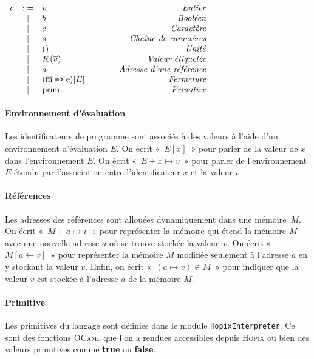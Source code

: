 \documentclass[a4paper,8pt]{article}
\newcommand{\comment}[1]{\hspace{3cm}\hfill \mbox{\textit{#1}}}
\newenvironment{BNF}[1][\linewidth]%
{\begin{math}\begin{array}{rclr}}%
{\end{array}\end{math}}%
\newcommand{\car}[1]{\texttt{#1}}
\newcommand\mvalue{v}
\newcommand\env{E}
\newcommand\store{M}
\newcommand\meta[1]{\textrm{#1}}
\newcommand\expr{\meta{e}}
\newcommand\id{x}
\newcommand\cid{K}
\newcommand\lint{n}
\newcommand\lchar{c}
\newcommand\lbool{b}
\newcommand\lstring{s}
\newcommand\pattern{\meta{m}}
\newcommand\addr{a}
\newcommand\unit{()}
\newlength\codewidth
\newenvironment{code}[1][\codewidth]{
\begin{center}
\Sbox
\hspace{0.3cm}\minipage{#1}\small
}{
\endminipage
\endSbox\fbox{\TheSbox}
\end{center}
}
\newcommand\many[1]{\overline{#1}}
\begin{document}
\begin{code}[17cm]
\begin{BNF}
  \mvalue & ::= &
\lint
\comment{Entier}
\\
& | &
\lbool
\comment{Booléen}
\\
& | &
\lchar
\comment{Caractère}
\\
& | &
\lstring
\comment{Chaîne de caractères}
\\
& | &
\unit
\comment{Unité}
\\
& | &
\cid (\many\mvalue)
\comment{Valeur étiquetée}
\\
& | &
\addr
\comment{Adresse d'une référence}
\\
& | &
(\many\pattern \;\car{=>}\; \expr) [\env]
\comment{Fermeture}
\\
& | &
\textrm{prim}
\comment{Primitive}
\end{BNF}
\end{code}

\paragraph{Environnement d'évaluation}
Les identificateurs de programme sont associés à des valeurs à l'aide
d'un environnement d'évaluation $\env$. On écrit «~$\env[\id]$~» pour
parler de la valeur de $\id$ dans l'environnement $\env$.  On écrit
«~$\env + \id \mapsto \mvalue$~» pour parler de l'environnement $\env$
étendu par l'association entre l'identificateur $\id$ et la valeur
$\mvalue$.

\paragraph{Références}
Les adresses des références sont allouées dynamiquement dans une
mémoire~$\store$.  On écrit «~$\store + \addr \mapsto \mvalue$~» pour
représenter la mémoire qui étend la mémoire $\store$ avec une nouvelle
adresse $\addr$ où se trouve stockée la valeur~$\mvalue$. On écrit
«~$\store[\addr \leftarrow \mvalue]$~» pour représenter la mémoire
$\store$ modifiée seulement à l'adresse $\addr$ en y stockant la
valeur $\mvalue$. Enfin, on écrit
«~$(\addr \mapsto \mvalue) \in \store$~» pour indiquer que la valeur
$\mvalue$ est stockée à l'adresse $\addr$ de la mémoire $\store$.

\paragraph{Primitive}
Les primitives du langage sont définies dans le module
\verb!HopixInterpreter!. Ce sont des fonctions \textsc{OCaml}
que l'on a rendues accessibles depuis \textsc{Hopix} ou bien
des valeurs primitives comme \textbf{true} ou \textbf{false}.
\end{document}
